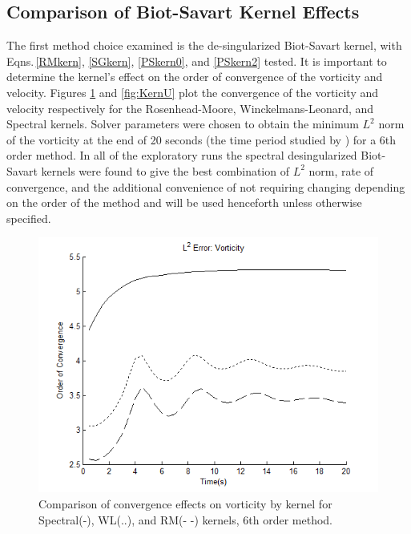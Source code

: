 \documentclass[letterpaper,12pt]{report}
\begin{document}
\subsection{Comparison of Biot-Savart Kernel Effects}\label{Pkern}
The first method choice examined is the de-singularized Biot-Savart kernel, with Eqns.\,\eqref{RMkern}, \eqref{SGkern}, \eqref{PSkern0}, and \eqref{PSkern2} tested. It is important to determine the kernel's effect on the order of convergence of the vorticity and velocity. Figures \ref{fig:KernW} and \ref{fig:KernU} plot the convergence of the vorticity and velocity respectively for the Rosenhead-Moore, Winckelmans-Leonard, and Spectral kernels. Solver parameters were chosen to obtain the minimum $L^2$ norm of the vorticity at the end of 20 seconds (the time period studied by \cite{Perlmann1985}) for a 6th order method. In all of the exploratory runs the spectral desingularized Biot-Savart kernels were found to give the best combination of $L^2$ norm, rate of convergence, and the additional convenience of not requiring changing depending on the order of the method and will be used henceforth unless otherwise specified.
\begin{figure}
\centering
\includegraphics[width=1\textwidth]{KernW.PNG}
\caption{\label{fig:KernW}Comparison of convergence effects on vorticity by kernel for Spectral(-), WL(..), and RM(- -) kernels, 6th order method.}
\end{figure}
\end{document}
